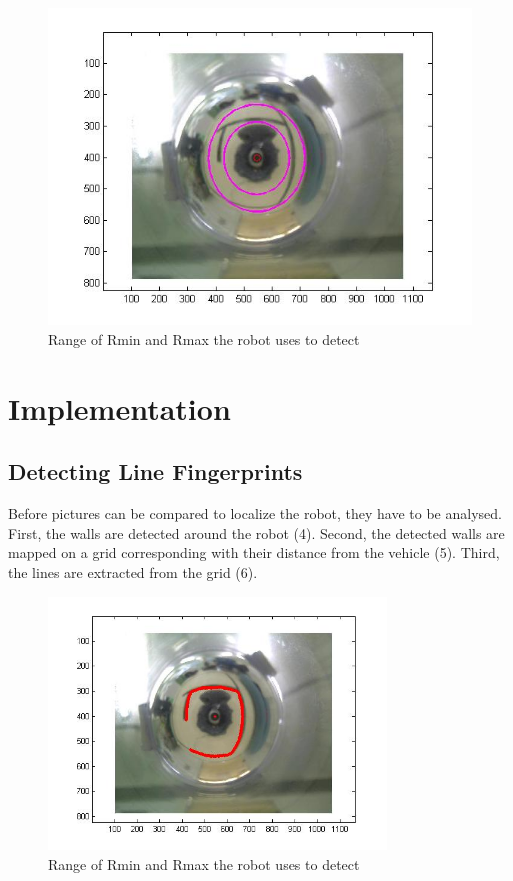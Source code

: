 \documentclass[12pt]{article}
\begin{document}
\begin{figure}[H]
	\centering
	\includegraphics[width=\textwidth]{radius.jpg}
	\caption{Range of Rmin and Rmax the robot uses to detect}
\end{figure}

\section{Implementation}
\subsection{Detecting Line Fingerprints}
Before pictures can be compared to localize the robot, they have to be analysed. First, the walls are detected around the robot (4). Second, the detected walls are mapped on a grid corresponding with their distance from the vehicle (5). Third, the lines are extracted from the grid (6).

\begin{figure}[H]
	\centering
	\includegraphics[width=0.8\textwidth]{points.jpg}
	\caption{Range of Rmin and Rmax the robot uses to detect}
\end{figure}
\end{document}
